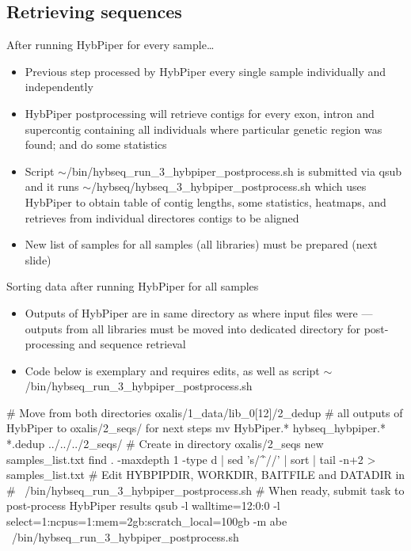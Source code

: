 \documentclass[compress, ucs, xelatex, 11pt, xcolor=x11names, aspectratio=169,
	hyperref={
		bookmarks=true,
		unicode=true,
		colorlinks=true,
		pdftitle={HybSeq course},
		plainpages=false,
		pdfauthor={Vojtech Zeisek},
		pdfsubject={Practical processing of HybSeq target enrichment sequencing data on computing grids like MetaCentrum},
		pdfcreator={XeLaTeX},
		pdfkeywords={BASH, command line, GNU, HybSeq, Linux, MetaCentrum, sequencing shell, target enrichment},
		linkcolor=Cyan2, %
		anchorcolor=Firebrick2, %
		citecolor=Firebrick2, %
		filecolor=Firebrick2, %
		menucolor=Firebrick2, %
		urlcolor=Chartreuse2, %
		pdftex},
	url={hyphens, lowtilde} %
	]{beamer}
\renewcommand{\texttt}[1]{\colorbox{Snow4}{{\ttfamily #1}}}
\renewcommand{\alert}[1]{\textcolor{OrangeRed2}{#1}}
\begin{document}
\subsection{Retrieving sequences}

\begin{frame}{After running HybPiper for every sample\ldots}
	\begin{itemize}
		\item Previous step processed by HybPiper every single sample individually and independently
		\item HybPiper postprocessing will retrieve contigs for every exon, intron and supercontig containing all individuals where particular genetic region was found; and do some statistics
		\item Script \texttt{$\sim$/bin/hybseq\_run\_3\_hybpiper\_postprocess.sh} is submitted via \texttt{qsub} and it runs \texttt{$\sim$/hybseq/hybseq\_3\_hybpiper\_postprocess.sh} which uses HybPiper to obtain table of contig lengths, some statistics, heatmaps, and retrieves from individual directores contigs to be aligned
		\item New list of samples for all samples (all libraries) must be prepared (next slide)
	\end{itemize}
\end{frame}

\begin{frame}[fragile]{Sorting data after running HybPiper for all samples}
	\begin{itemize}
		\item Outputs of HybPiper are in same directory as where input files were --- outputs from all libraries must be moved into dedicated directory for post-processing and sequence retrieval
		\item \alert{Code below is exemplary and requires edits, as well as script \texttt{$\sim$/bin/hybseq\_run\_3\_hybpiper\_postprocess.sh}}
	\end{itemize}
	\begin{bashcode}
    # Move from both directories oxalis/1_data/lib_0[12]/2_dedup
    # all outputs of HybPiper to oxalis/2_seqs/ for next steps
    mv HybPiper.* hybseq_hybpiper.* *.dedup ../../../2_seqs/
    # Create in directory oxalis/2_seqs new samples_list.txt
    find . -maxdepth 1 -type d | sed 's/^\.\///' | sort | tail -n+2 >
      samples_list.txt
    # Edit HYBPIPDIR, WORKDIR, BAITFILE and DATADIR in
    # ~/bin/hybseq_run_3_hybpiper_postprocess.sh
    # When ready, submit task to post-process HybPiper results
    qsub -l walltime=12:0:0 -l select=1:ncpus=1:mem=2gb:scratch_local=100gb
       -m abe ~/bin/hybseq_run_3_hybpiper_postprocess.sh
	\end{bashcode}
\end{frame}
\end{document}
